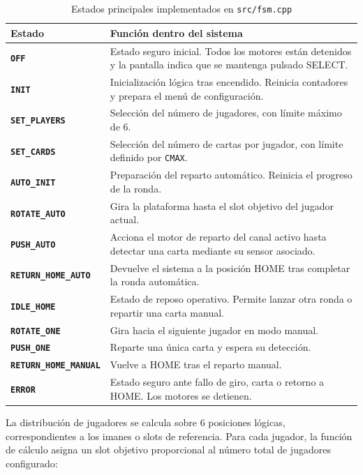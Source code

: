 \begin{table}[H]
\centering
\small
\begin{tabularx}{\textwidth}{>{\bfseries}p{}X}
\hline
\textbf{Estado} & \textbf{Función dentro del sistema} \\
\hline
\texttt{OFF} & Estado seguro inicial. Todos los motores están detenidos y la pantalla indica que se mantenga pulsado SELECT. \\
\texttt{INIT} & Inicialización lógica tras encendido. Reinicia contadores y prepara el menú de configuración. \\
\texttt{SET\_PLAYERS} & Selección del número de jugadores, con límite máximo de 6. \\
\texttt{SET\_CARDS} & Selección del número de cartas por jugador, con límite definido por \texttt{CMAX}. \\
\texttt{AUTO\_INIT} & Preparación del reparto automático. Reinicia el progreso de la ronda. \\
\texttt{ROTATE\_AUTO} & Gira la plataforma hasta el slot objetivo del jugador actual. \\
\texttt{PUSH\_AUTO} & Acciona el motor de reparto del canal activo hasta detectar una carta mediante su sensor asociado. \\
\texttt{RETURN\_HOME\_AUTO} & Devuelve el sistema a la posición HOME tras completar la ronda automática. \\
\texttt{IDLE\_HOME} & Estado de reposo operativo. Permite lanzar otra ronda o repartir una carta manual. \\
\texttt{ROTATE\_ONE} & Gira hacia el siguiente jugador en modo manual. \\
\texttt{PUSH\_ONE} & Reparte una única carta y espera su detección. \\
\texttt{RETURN\_HOME\_MANUAL} & Vuelve a HOME tras el reparto manual. \\
\texttt{ERROR} & Estado seguro ante fallo de giro, carta o retorno a HOME. Los motores se detienen. \\
\hline
\end{tabularx}
\caption{Estados principales implementados en \texttt{src/fsm.cpp}}
\label{tab:fsm_states}
\end{table}

La distribución de jugadores se calcula sobre 6 posiciones lógicas, correspondientes a los imanes o slots de referencia. Para cada jugador, la función de cálculo asigna un slot objetivo proporcional al número total de jugadores configurado:

